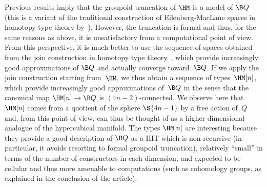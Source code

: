 \documentclass[a4paper]{article}
\begin{document}
Previous results imply that the groupoid truncation of $\HM$ is a model of $\B Q$ (this is a variant of the traditional construction of Eilenberg-MacLane spaces in homotopy type theory by~\cite{licata2014eilenberg}). However, the truncation is formal and thus, for the same reasons as above, it is unsatisfactory from a computational point of view. From this perspective, it is much better to use the sequence of spaces obtained from the join construction in homotopy type theory~\cite{rijke2017join,rijke2018classifying}, which provide increasingly good approximations of $\B Q$ and actually converge toward~$\B Q$.
%
If we apply the join construction starting from~$\HM$, we thus obtain a sequence of types~$\HM[n]$, which provide increasingly good approximations of~$\B Q$ in the sense that the canonical map $\HM[n]\to\B Q$ is $(4n-2)$-connected. We observe here that $\HM[n]$ comes from a quotient of the sphere $\S{4n-1}$ by a free action of~$Q$ and, from this point of view, can thus be thought of as a higher-dimensional analogue of the hypercubical manifold.
%
The types $\HM[n]$ are interesting because they provide a good description of $\B Q$ as a HIT which is non-recursive (in particular, it avoids resorting to formal groupoid truncation), relatively ``small'' in terms of the number of constructors in each dimension, and expected to be cellular and thus more amenable to computations (such as cohomology groups, as explained in the conclusion of the article).

%
\end{document}
